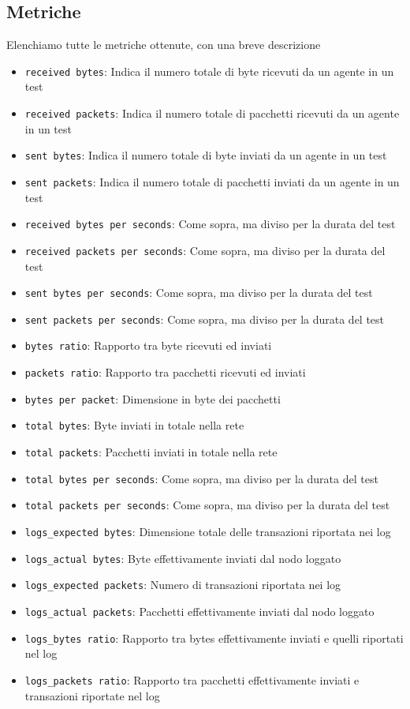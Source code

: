 \documentclass[12pt, a4paper]{article}
\begin{document}
\subsection{Metriche}

Elenchiamo tutte le metriche ottenute, con una breve descrizione

\begin{itemize}
    \item \lstinline{received bytes}: Indica il numero totale di byte ricevuti da un agente in un test
    \item \lstinline{received packets}: Indica il numero totale di pacchetti ricevuti da un agente in un test
    \item \lstinline{sent bytes}: Indica il numero totale di byte inviati da un agente in un test
    \item \lstinline{sent packets}: Indica il numero totale di pacchetti inviati da un agente in un test
    \item \lstinline{received bytes per seconds}: Come sopra, ma diviso per la durata del test
    \item \lstinline{received packets per seconds}: Come sopra, ma diviso per la durata del test
    \item \lstinline{sent bytes per seconds}: Come sopra, ma diviso per la durata del test
    \item \lstinline{sent packets per seconds}: Come sopra, ma diviso per la durata del test
    \item \lstinline{bytes ratio}: Rapporto tra byte ricevuti ed inviati
    \item \lstinline{packets ratio}: Rapporto tra pacchetti ricevuti ed inviati
    \item \lstinline{bytes per packet}: Dimensione in byte dei pacchetti
    \item \lstinline{total bytes}: Byte inviati in totale nella rete
    \item \lstinline{total packets}: Pacchetti inviati in totale nella rete
    \item \lstinline{total bytes per seconds}: Come sopra, ma diviso per la durata del test
    \item \lstinline{total packets per seconds}: Come sopra, ma diviso per la durata del test
    \item \lstinline{logs_expected bytes}: Dimensione totale delle transazioni riportata nei log
    \item \lstinline{logs_actual bytes}: Byte effettivamente inviati dal nodo loggato
    \item \lstinline{logs_expected packets}: Numero di transazioni riportata nei log
    \item \lstinline{logs_actual packets}: Pacchetti effettivamente inviati dal nodo loggato
    \item \lstinline{logs_bytes ratio}: Rapporto tra bytes effettivamente inviati e quelli riportati nel log
    \item \lstinline{logs_packets ratio}: Rapporto tra pacchetti effettivamente inviati e transazioni riportate nel log
\end{itemize}
\end{document}
